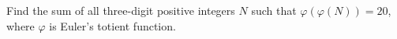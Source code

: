 Find the sum of all three-digit positive integers $N$ such that $\varphi(\varphi(N))=20$, where $\varphi$ is Euler's totient function.
